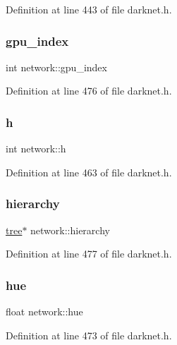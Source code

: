 Definition at line 443 of file darknet.\+h.

\mbox{\label{structnetwork_a8ba8b1354e8d018ac74920eb0cd882e8}} 
\subsubsection{\texorpdfstring{gpu\_index}{gpu\_index}}
{\footnotesize\ttfamily int network\+::gpu\+\_\+index}



Definition at line 476 of file darknet.\+h.

\mbox{\label{structnetwork_a0e57f4230f8ecb07bba0c97cf8f045c7}} 
\subsubsection{\texorpdfstring{h}{h}}
{\footnotesize\ttfamily int network\+::h}



Definition at line 463 of file darknet.\+h.

\mbox{\label{structnetwork_a36d6158f07498646e400bf6f7e20a705}} 
\subsubsection{\texorpdfstring{hierarchy}{hierarchy}}
{\footnotesize\ttfamily \mbox{\hyperlink{structtree}{tree}}$\ast$ network\+::hierarchy}



Definition at line 477 of file darknet.\+h.

\mbox{\label{structnetwork_ae38058a4e1ad0a334026ecbe01f101f4}} 
\subsubsection{\texorpdfstring{hue}{hue}}
{\footnotesize\ttfamily float network\+::hue}



Definition at line 473 of file darknet.\+h.

